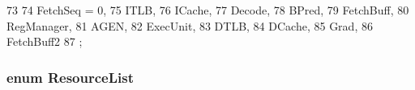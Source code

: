 \begin{DoxyCode}
73                       {
74        FetchSeq = 0,
75        ITLB,
76        ICache,
77        Decode,
78        BPred,
79        FetchBuff,
80        RegManager,
81        AGEN,
82        ExecUnit,
83        DTLB,
84        DCache,
85        Grad,
86        FetchBuff2
87     };
\end{DoxyCode}
\hypertarget{namespaceThePipeline_a20c49520a50d0b1ad56baad8ba94d3d1}{
\subsubsection[{ResourceList}]{\setlength{\rightskip}{0pt plus 5cm}enum {\bf ResourceList}}}
\label{namespaceThePipeline_a20c49520a50d0b1ad56baad8ba94d3d1}
